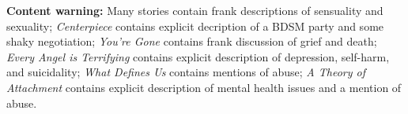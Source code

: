 \null

\vfill

\noindent \textbf{Content warning:} Many stories contain frank descriptions of sensuality and sexuality; \emph{Centerpiece} contains explicit decription of a BDSM party and some shaky negotiation; \emph{You're Gone} contains frank discussion of grief and death; \emph{Every Angel is Terrifying} contains explicit description of depression, self-harm, and suicidality; \emph{What Defines Us} contains mentions of abuse; \emph{A Theory of Attachment} contains explicit description of mental health issues and a mention of abuse.
